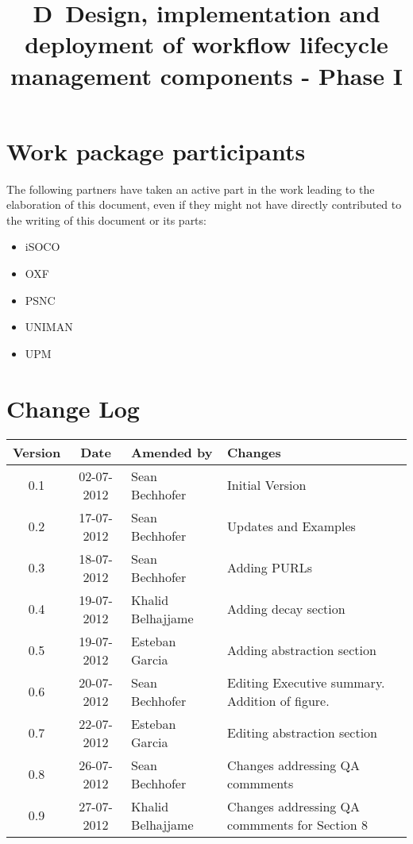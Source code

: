 \documentclass[a4paper, twoside, 11pt]{article}
\title{D\delid\ Design, implementation and deployment of workflow
  lifecycle management components - Phase I}
\begin{document}
\maketitle


\section*{Work package participants} The following partners have taken an active part in the work leading to the elaboration of this document, even if they might not have directly contributed to the writing of this document or its parts: %
\begin{itemize}
\item iSOCO
\item OXF
\item PSNC
\item UNIMAN
\item UPM
\end{itemize}

\section*{Change Log}
\begin{centering}

\begin{tabular}{|c|c|p{4.92cm}|p{6.5cm}|}

\hline \textbf{Version} & \textbf{Date} & \textbf{Amended by} & \textbf{Changes} \\ \hline
0.1 & 02-07-2012 & Sean Bechhofer & Initial Version \\ \hline
0.2 & 17-07-2012 & Sean Bechhofer & Updates and Examples \\ \hline
0.3 & 18-07-2012 & Sean Bechhofer & Adding PURLs\\ \hline
0.4 & 19-07-2012 & Khalid Belhajjame & Adding decay section \\ \hline
0.5 & 19-07-2012 & Esteban Garcia & Adding abstraction section \\ \hline
0.6 & 20-07-2012 & Sean Bechhofer & Editing Executive
summary. Addition of figure. \\ \hline
0.7 & 22-07-2012 & Esteban Garcia & Editing abstraction section \\ \hline
0.8 & 26-07-2012 & Sean Bechhofer & Changes addressing QA commments \\ \hline
0.9 & 27-07-2012 & Khalid Belhajjame & Changes addressing QA commments for Section 8 \\ \hline

\end{tabular}

\end{centering}
\clearpage
\end{document}

